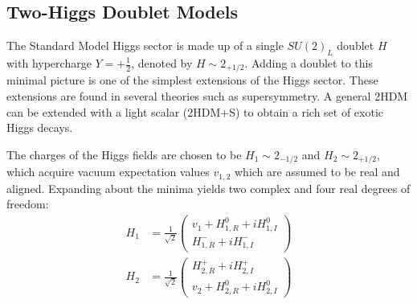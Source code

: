 \documentclass{article}
\begin{document}
\subsection{Two-Higgs Doublet Models}

 

The Standard Model Higgs sector is made up of a single $SU(2)_L$ doublet $H$ with hypercharge $Y = +\frac{1}{2}$, denoted by $H \sim 2_{+1/2}$. Adding a doublet to this minimal picture is one of the simplest extensions of the Higgs sector. These extensions are found in several theories such as supersymmetry. A general 2HDM can be extended with a light scalar (2HDM+S) to obtain a rich set of exotic Higgs decays. 

The charges of the Higgs fields are chosen to be $H_1 \sim 2_{-1/2}$ and $H_2 \sim 2_{+1/2}$, which acquire vacuum expectation values $v_{1,2}$ which are assumed to be real and aligned. Expanding about the minima yields two complex and four real degrees of freedom:
\begin{align}
    H_1 &= \frac{1}{\sqrt{2}} \begin{pmatrix} v_1 + H^{0}_{1, R} + iH^0_{1, I} \\  
                                              H^-_{1,R} + i H^-_{1, I}   \end{pmatrix} \\
    H_2 &= \frac{1}{\sqrt{2}} \begin{pmatrix} H^+_{2, R} + iH^+_{2, I} \\  
                                              v_2 + H^0_{2,R} + i H^0_{2, I}   \end{pmatrix} \\
\end{align}
\end{document}
